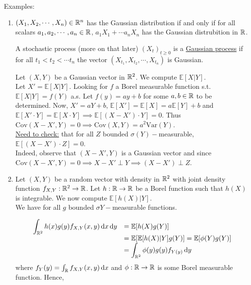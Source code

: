\documentclass{article}
\begin{document}
\begin{examplesblock}{Examples: }\label{examples: 1}

\begin{enumerate}
	\item 
\begin{boxdef}[Gaussian]\label{def: gaussian dist}
$ (X_{1}, X_{2}, \cdots, X_{n})\in \mathbb{R}^{n}$ has the Gaussian distribution if and only if for all scalars $ a_{1}, a_{2}, \cdots, a_{n}\in \mathbb{R}$, $ a_{1}X_{1}+\cdots a_{n}X_{n}$ has the Gaussian distrubition in $ \mathbb{R}$.
\end{boxdef}

A stochastic process (more on that later) $ (X_{t})_{t\geq 0}$ is a \underline{Gaussian process} if for all $ t_{1}<t_{2}<\cdots t_{n}$ the vector $ (X_{t_{1}}, X_{t_{2}}, \cdots, X_{t_{n}})$ is Gaussian.

Let $ (X,Y)$ be a Gaussian vector in $ \mathbb{R}^{2}$. We compute $\mathbb{E}[X|Y]$.\\ 
Let $ X' =\mathbb{E}[X|Y]$. Looking for $ f$ a Borel measurable function s.t. $ \mathbb{E}[X|Y] = f(Y)$ a.s. Let $ f(y) = ay+b$ for some $ a,b\in \mathbb{R}$ to be determined. Now, $ X' = aY+b$, $\mathbb{E}[X'] =\mathbb{E}[X] = a\mathbb{E}[Y]+b$ and $\mathbb{E}[X'\cdot Y] =\mathbb{E}[X\cdot Y]\implies\mathbb{E}[(X-X')\cdot Y]=0$. Thus $ \text{Cov}(X-X', Y)=0\implies \text{Cov}(X,Y) = a^{2}\text{Var}(Y)$.\\ 

\underline{Need to check:} that for all $ Z$ bounded $ \sigma(Y)-$measurable, $ \mathbb{E}[(X-X')\cdot Z] = 0$.\\ 
Indeed, observe that $ (X-X', Y)$ is a Gaussian vector and since $ \text{Cov}(X-X', Y) = 0\implies X-X'\perp Y\implies (X-X')\perp Z$.

\item Let $ (X,Y)$ be a random vector with density in $ \mathbb{R}^{2}$ with joint density function $ f_{X,Y}:\mathbb{R}^{2}\to \mathbb{R}$. Let $ h:\mathbb{R}\to \mathbb{R}$ be a Borel function such that  $ h(X)$ is integrable. We now compute $\mathbb{E}[h(X)| Y]$.\\ 
We have for all $ g$ bounded $ \sigma{Y}-$measurable functions.
	
\[
\begin{array}{ll}
	\displaystyle\int_{\mathbb{R}^{2}}h(x)g(y)f_{X,Y}(x,y) \operatorname{d}\! x \operatorname{d}\! y &=  \mathbb{E}[h(X)g(Y)]\\ 
								       &=\mathbb{E}[\mathbb{E}[h(X)|Y]g(Y)] =\mathbb{E}[\phi(Y)g(Y)]\\ 
								       &= \displaystyle\int_{\mathbb{R}^{2}}\phi(y)g(y)f_{Y(y)} \operatorname{d}\! y  
\end{array}
\]
where $ f_{Y}(y) = \int_{\mathbb{R}}f_{X,Y}(x,y) \operatorname{d}\! x  $ and $ \phi:\mathbb{R}\to \mathbb{R}$ is some Borel measurable function. Hence, 


\end{enumerate}
\end{examplesblock}
\end{document}
